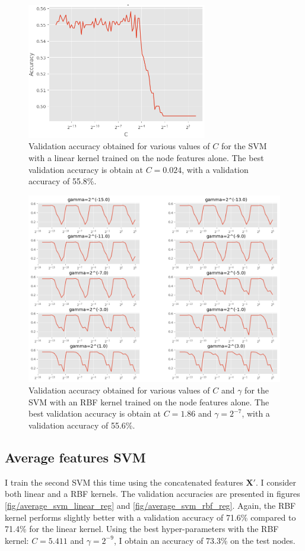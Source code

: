 \documentclass[12pt]{article}
\theoremstyle{definition}
\begin{document}
\begin{figure}[h]
	\includegraphics[width=0.7\textwidth]{node_svm/linear_reg}
	\centering
	\caption{Validation accuracy obtained for various values of $C$ for the SVM with a linear kernel trained on the node features alone. The best validation accuracy is obtain at $C=0.024$, with a validation accuracy of 55.8\%.}
	\label{fig/node_svm_linear_reg}
\end{figure}
\begin{figure}[h]
	\includegraphics[width=1.0\textwidth]{node_svm/rbf_reg}
	\centering
	\caption{Validation accuracy obtained for various values of $C$ and $\gamma$ for the SVM with an RBF kernel trained on the node features alone. The best validation accuracy is obtain at $C=1.86$ and $\gamma=2^{-7}$, with a validation accuracy of 55.6\%.}
	\label{fig/node_svm_rbf_reg}
\end{figure}

\subsection{Average features SVM}
I train the second SVM this time using the concatenated features $\mathbf{X}'$. I consider both linear and a RBF kernels. The validation accuracies are presented in figures \ref{fig/average_svm_linear_reg} and \ref{fig/average_svm_rbf_reg}. Again, the RBF kernel performs slightly better with a validation accuracy of 71.6\% compared to 71.4\% for the linear kernel. Using the best hyper-parameters with the RBF kernel: $C=5.411$ and $\gamma = 2^{-9}$, I obtain an accuracy of 73.3\% on the test nodes.
\end{document}
